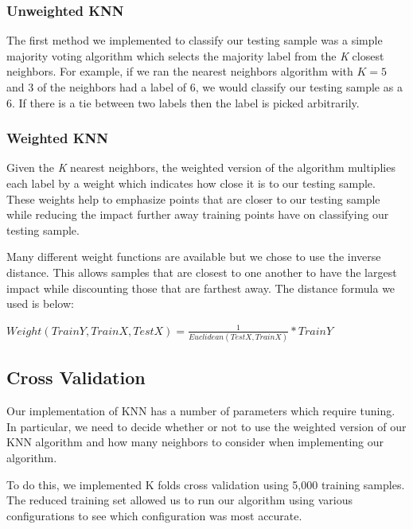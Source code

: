 \documentclass{article} %
\begin{document}
\subsubsection{Unweighted KNN}

The first method we implemented to classify our testing sample was a simple
majority voting algorithm which selects the majority label from the \textit{K}
closest neighbors. For example, if we ran the nearest neighbors algorithm with
$K = 5$ and 3 of the neighbors had a label of 6, we would classify our testing
sample as a 6. If there is a tie between two labels then the label is picked 
arbitrarily. 

\subsubsection{Weighted KNN}

Given the \textit{K} nearest neighbors, the weighted version of the algorithm
multiplies each label by a weight which indicates how close it is to our testing
sample. These weights help to emphasize points that are closer to our testing
sample while reducing the impact further away training points have on
classifying our testing sample.

Many different weight functions are available but we chose to use the inverse
distance. This allows samples that are closest to one another to have the 
largest impact while discounting those that are farthest away. The distance
formula we used is below:

\begin{center}
$Weight(TrainY, TrainX, TestX) = \frac{1}{Euclidean(TestX, TrainX)}*TrainY$
\end{center}


\subsection{Cross Validation}

Our implementation of KNN has a number of parameters which require
tuning. In particular, we need to decide whether or not to use the weighted
version of our KNN algorithm and how many neighbors to consider when
implementing our algorithm.

To do this, we implemented K folds cross validation using 5,000 training
samples. The reduced training set allowed us to run our algorithm using various
configurations to see which configuration was most accurate.
\end{document}
